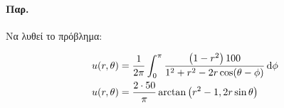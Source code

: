 \documentclass[12pt,a4paper,notitlepage,fleqn]{article}
\begin{document}
    \paragraph{Παρ.}
    Να λυθεί το πρόβλημα:
    
    \begin{align*}
    	u(r,\theta) &= \frac{1}{2\pi} \int_{0}^{\pi}
    	\frac{\left(1-r^2\right)100}{1^2+r^2-2r\cos(\theta-\phi)}\mathop{}\!\mathrm{d}\phi
    	\\
    	u(r,\theta) &= \frac{2\cdot 50}{\pi} \arctan\left(r^2-1,2r\sin\theta\right)
    \end{align*}
    
    \paragraph{}
\end{document}
